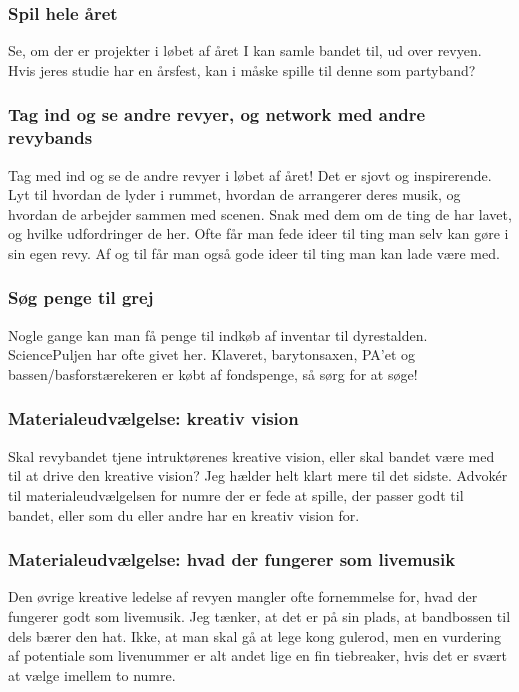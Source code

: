 \subsubsection{Spil hele året}
Se, om der er projekter i løbet af året I kan samle bandet til, ud over revyen. Hvis jeres studie har en årsfest, kan i måske spille til denne som partyband?

\subsubsection{Tag ind og se andre revyer, og network med andre revybands}
Tag med ind og se de andre revyer i løbet af året! Det er sjovt og inspirerende. Lyt til hvordan de lyder i rummet, hvordan de arrangerer deres musik, og hvordan de arbejder sammen med scenen. Snak med dem om de ting de har lavet, og hvilke udfordringer de her. Ofte får man fede ideer til ting man selv kan gøre i sin egen revy. Af og til får man også gode ideer til ting man kan lade være med.

\subsubsection{Søg penge til grej}
Nogle gange kan man få penge til indkøb af inventar til dyrestalden. SciencePuljen har ofte givet her. Klaveret, barytonsaxen, PA'et og bassen/basforstærekeren er købt af fondspenge, så sørg for at søge!

\subsubsection{Materialeudvælgelse: kreativ vision}
Skal revybandet tjene intruktørenes kreative vision, eller skal bandet være med til at drive den kreative vision? Jeg hælder helt klart mere til det sidste. Advokér til materialeudvælgelsen for numre der er fede at spille, der passer godt til bandet, eller som du eller andre har en kreativ vision for.

\subsubsection{Materialeudvælgelse: hvad der fungerer som livemusik}
Den øvrige kreative ledelse af revyen mangler ofte fornemmelse for, hvad der fungerer godt som livemusik.
Jeg tænker, at det er på sin plads, at bandbossen til dels bærer den hat.
Ikke, at man skal gå at lege kong gulerod, men en vurdering af potentiale som livenummer er alt andet lige en fin tiebreaker, hvis det er svært at vælge imellem to numre.

